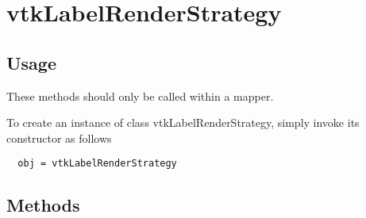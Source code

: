 \section{vtkLabelRenderStrategy}

\subsection{Usage}

 These methods should only be called within a mapper.

To create an instance of class vtkLabelRenderStrategy, simply
invoke its constructor as follows
\begin{verbatim}
  obj = vtkLabelRenderStrategy
\end{verbatim}
\subsection{Methods}

